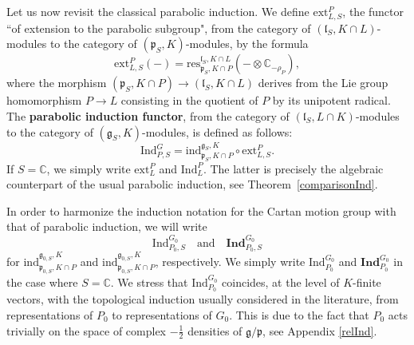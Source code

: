 \documentclass{amsart}
\theoremstyle{definition}
\begin{document}
Let us now revisit the classical parabolic induction. We define $\mathrm{ext}_{L,S}^P$, the functor ``of extension to the parabolic subgroup", from the category of $(\mathfrak{l}_S,K\cap L)$-modules to the category of $(\mathfrak{p}_S, K)$-modules, by the formula
\begin{equation}\label{first_ext} \mathrm{ext}_{L,S}^P(-) = \mathrm{res}^{\mathfrak{l}_S, K\cap L}_{\mathfrak{p}_S, K\cap P}(- \otimes \mathbb{C}_{-\rho_P}),\end{equation}
where the morphism $(\mathfrak{p}_S, K\cap P) \to (\mathfrak{l}_S, K\cap L)$ derives from the Lie group homomorphism $P \to L$ consisting in the quotient of $P$ by its unipotent radical.
The \textbf{parabolic induction functor}, from the category of $(\mathfrak{l}_S,L\cap K)$-modules to the category of $(\mathfrak{g}_S,K)$-modules, is defined as follows: \begin{equation}\label{first_parabolic_induction}
    \mathrm{Ind}_{P,S}^G = \mathrm{ind}_{\mathfrak{p}_S,K\cap P}^{\mathfrak{g}_S,K} \circ \mathrm{ext}_{L,S}^P.
\end{equation}
If $S = \mathbb{C}$, we simply write $\mathrm{ext}_L^P$ and $\mathrm{Ind}_L^P$. The latter is precisely the algebraic counterpart of the usual parabolic induction, see Theorem~\ref{comparisonInd}.

In order to harmonize the induction notation for the Cartan motion group with that of parabolic induction, we will write
\begin{equation}\mathrm{Ind}_{P_0,S}^{G_0} \quad \text{and}\quad \mathbf{Ind}_{P_0,S}^{G_0}\end{equation}
for $\mathrm{ind}_{\mathfrak{p}_{0,S},K\cap P}^{\mathfrak{g}_{0,S},K}$ and $\mathrm{ind}_{\bm{\mathfrak{p}}_{0,S},K\cap P}^{\bm{\mathfrak{g}}_{0,S},K}$, respectively. We simply write $\mathrm{Ind}_{P_0}^{G_0}$ and $\mathbf{Ind}_{P_0}^{G_0}$ in the case where $S = \mathbb{C}$. We stress that $\mathrm{Ind}_{P_0}^{G_0}$ coincides, at the level of $K$-finite vectors, with the topological induction usually considered in the literature, from representations of $P_0$ to representations of $G_0$. This is due to the fact that $P_0$ acts trivially on the space of complex \(-\tfrac{1}{2}\) densities of $\mathfrak{g}/\mathfrak{p}$, see Appendix \ref{relInd}.
\end{document}
